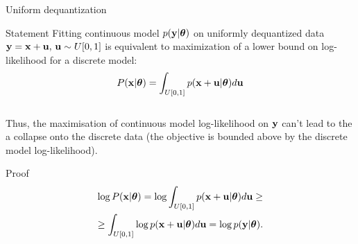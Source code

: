 \begin{frame}{Uniform dequantization}
	\begin{block}{Statement}
		Fitting continuous model $p(\mathbf{y} | \boldsymbol{\theta})$ on uniformly dequantized data $\mathbf{y} = \mathbf{x} + \mathbf{u}, \, \mathbf{u} \sim U[0, 1]$ is equivalent to maximization of a lower bound on log-likelihood for a discrete model:
		\[
		P(\mathbf{x} | \boldsymbol{\theta}) = \int_{U[0, 1]} p(\mathbf{x} + \mathbf{u} | \boldsymbol{\theta}) d \mathbf{u}
		\]
		\vspace{-0.2cm} \\
		Thus, the maximisation of continuous model log-likelihood on $\mathbf{y}$ can't lead to the a collapse onto the discrete data (the objective is bounded above by the discrete model log-likelihood).
	\end{block}
	\begin{block}{Proof}
		\vspace{-1cm}
		\begin{multline*}
			 \log P(\mathbf{x} | \boldsymbol{\theta}) = \log \int_{U[0, 1]} p(\mathbf{x} + \mathbf{u} | \boldsymbol{\theta}) d \mathbf{u} \geq \\ \geq \int_{U[0, 1]} \log p(\mathbf{x} + \mathbf{u} | \boldsymbol{\theta}) d \mathbf{u} = \log p(\mathbf{y} | \boldsymbol{\theta}).
		\end{multline*}
	\end{block}
\end{frame}
